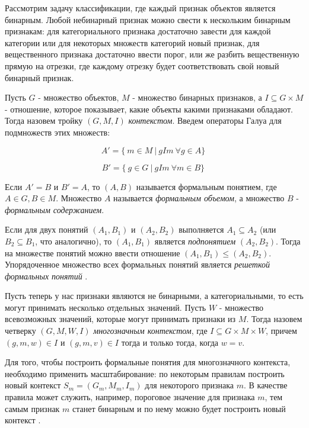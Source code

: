 \documentclass{article}
\begin{document}
Рассмотрим задачу классификации, где каждый признак объектов является бинарным. Любой небинарный признак можно свести к нескольким бинарным признакам: для категориального признака достаточно завести для каждой категории или для некоторых множеств категорий новый признак, для вещественного признака достаточно ввести порог, или же разбить вещественную прямую на отрезки, где каждому отрезку будет соответствовать свой новый бинарный признак.

Пусть $G$ - множество объектов, $M$ - множество бинарных признаков, а $I \subseteq G \times M$ - отношение, которое показывает, какие объекты какими признаками обладают. Тогда назовем тройку $(G, M, I)$ \emph{контекстом}. Введем операторы Галуа для подмножеств этих множеств: 

$$A' = \{\ m \in M \: | \: gIm \: \forall g \in A\}\ $$

$$B' = \{\ g \in G \: | \: gIm \: \forall m \in B\}\ $$

Если $A' = B$ и $B' = A$, то $(A, B)$ называется формальным понятием, где $A \in G, B \in M$. Множество $A$ называется \emph{формальным объемом}, а множество $B$ - \emph{формальным содержанием}. 

Если для двух понятий $(A_1, B_1)$ и $(A_2, B_2)$ выполняется $A_1 \subseteq A_2$ (или $B_2 \subseteq B_1$, что аналогично), то $(A_1, B_1)$ является \emph{подпонятием} $(A_2, B_2)$. Тогда на множестве понятий можно ввести отношение $(A_1, B_1) \leq (A_2, B_2)$. Упорядоченное множество всех формальных понятий является \emph{решеткой формальных понятий} \citep{1}. 

Пусть теперь у нас признаки являются не бинарными, а категориальными, то есть могут принимать несколько отдельных значений. Пусть $W$ - множество всевозможных значений, которые могут принимать признаки из $M$. Тогда назовем четверку $(G, M, W, I)$ \emph{многозначным контекстом}, где $I \subseteq G \times M \times W$, причем $(g, m, w) \in I$ и $(g, m, v) \in I$ тогда и только тогда, когда $w = v$. 

Для того, чтобы построить формальные понятия для многозначного контекста, необходимо применить масштабирование: по некоторым правилам построить новый контекст $S_m = (G_m, M_m, I_m)$ для некоторого признака $m$. В качестве правила может служить, например, пороговое значение для признака $m$, тем самым признак $m$ станет бинарным и по нему можно будет построить новый контекст \citep{2}. 
\end{document}
